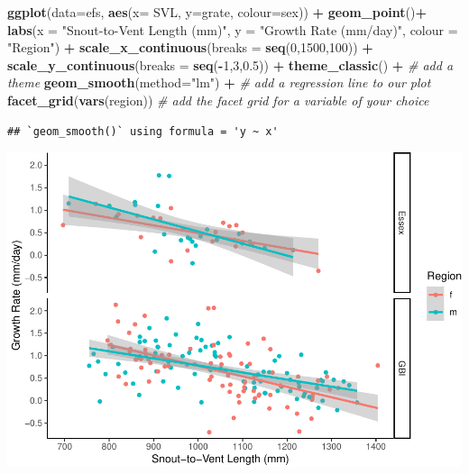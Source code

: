 \documentclass[
]{book}
\newenvironment{Shaded}{\begin{snugshade}}{\end{snugshade}}
\newcommand{\AttributeTok}[1]{\textcolor[rgb]{0.13,0.29,0.53}{#1}}
\newcommand{\CommentTok}[1]{\textcolor[rgb]{0.56,0.35,0.01}{\textit{#1}}}
\newcommand{\DecValTok}[1]{\textcolor[rgb]{0.00,0.00,0.81}{#1}}
\newcommand{\FloatTok}[1]{\textcolor[rgb]{0.00,0.00,0.81}{#1}}
\newcommand{\FunctionTok}[1]{\textcolor[rgb]{0.13,0.29,0.53}{\textbf{#1}}}
\newcommand{\NormalTok}[1]{#1}
\newcommand{\SpecialCharTok}[1]{\textcolor[rgb]{0.81,0.36,0.00}{\textbf{#1}}}
\newcommand{\StringTok}[1]{\textcolor[rgb]{0.31,0.60,0.02}{#1}}
\begin{document}
\begin{Shaded}
\begin{Highlighting}[]
\FunctionTok{ggplot}\NormalTok{(}\AttributeTok{data=}\NormalTok{efs, }\FunctionTok{aes}\NormalTok{(}\AttributeTok{x=}\NormalTok{ SVL, }\AttributeTok{y=}\NormalTok{grate, }\AttributeTok{colour=}\NormalTok{sex)) }\SpecialCharTok{+}      
        \FunctionTok{geom\_point}\NormalTok{()}\SpecialCharTok{+}   
        \FunctionTok{labs}\NormalTok{(}\AttributeTok{x =} \StringTok{"Snout{-}to{-}Vent Length (mm)"}\NormalTok{,        }
            \AttributeTok{y =} \StringTok{"Growth Rate (mm/day)"}\NormalTok{,}
            \AttributeTok{colour =} \StringTok{"Region"}\NormalTok{) }\SpecialCharTok{+}   
        \FunctionTok{scale\_x\_continuous}\NormalTok{(}\AttributeTok{breaks =} \FunctionTok{seq}\NormalTok{(}\DecValTok{0}\NormalTok{,}\DecValTok{1500}\NormalTok{,}\DecValTok{100}\NormalTok{)) }\SpecialCharTok{+}
        \FunctionTok{scale\_y\_continuous}\NormalTok{(}\AttributeTok{breaks =} \FunctionTok{seq}\NormalTok{(}\SpecialCharTok{{-}}\DecValTok{1}\NormalTok{,}\DecValTok{3}\NormalTok{,}\FloatTok{0.5}\NormalTok{)) }\SpecialCharTok{+}   
        \FunctionTok{theme\_classic}\NormalTok{() }\SpecialCharTok{+}  \CommentTok{\# add a theme}
        \FunctionTok{geom\_smooth}\NormalTok{(}\AttributeTok{method=}\StringTok{"lm"}\NormalTok{) }\SpecialCharTok{+}  \CommentTok{\# add a regression line to our plot}
        \FunctionTok{facet\_grid}\NormalTok{(}\FunctionTok{vars}\NormalTok{(region))  }\CommentTok{\# add the facet grid for a variable of your choice}
\end{Highlighting}
\end{Shaded}

\begin{verbatim}
## `geom_smooth()` using formula = 'y ~ x'
\end{verbatim}

\includegraphics{series_files/figure-latex/unnamed-chunk-28-1.pdf}
\end{document}
